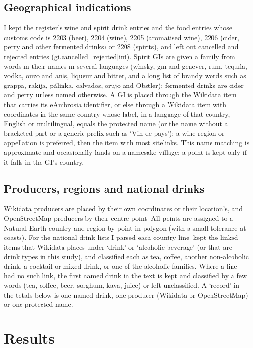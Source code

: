 \documentclass[11pt,a4paper]{article}
\begin{document}
\subsection{Geographical indications}
I kept the register's wine and spirit drink entries and the food entries whose customs code is 2203 (beer), 2204 (wine), 2205 (aromatised wine), 2206 (cider, perry and other fermented drinks) or 2208 (spirits), and left out cancelled and rejected entries ({{gi.cancelled_rejected|int}}). Spirit GIs are given a family from words in their names in several languages (whisky, gin and genever, rum, tequila, vodka, ouzo and anis, liqueur and bitter, and a long list of brandy words such as grappa, rakija, pálinka, calvados, orujo and Obstler); fermented drinks are cider and perry unless named otherwise. A GI is placed through the Wikidata item that carries its eAmbrosia identifier, or else through a Wikidata item with coordinates in the same country whose label, in a language of that country, English or multilingual, equals the protected name (or the name without a bracketed part or a generic prefix such as `Vin de pays'); a wine region or appellation is preferred, then the item with most sitelinks. This name matching is approximate and occasionally lands on a namesake village; a point is kept only if it falls in the GI's country.

\subsection{Producers, regions and national drinks}
Wikidata producers are placed by their own coordinates or their location's, and OpenStreetMap producers by their centre point. All points are assigned to a Natural Earth country and region by point in polygon (with a small tolerance at coasts). For the national drink lists I parsed each country line, kept the linked items that Wikidata places under `drink' or `alcoholic beverage' (or that are drink types in this study), and classified each as tea, coffee, another non-alcoholic drink, a cocktail or mixed drink, or one of the alcoholic families. Where a line had no such link, the first named drink in the text is kept and classified by a few words (tea, coffee, beer, sorghum, kava, juice) or left unclassified. A `record' in the totals below is one named drink, one producer (Wikidata or OpenStreetMap) or one protected name.

\section{Results}
\end{document}
